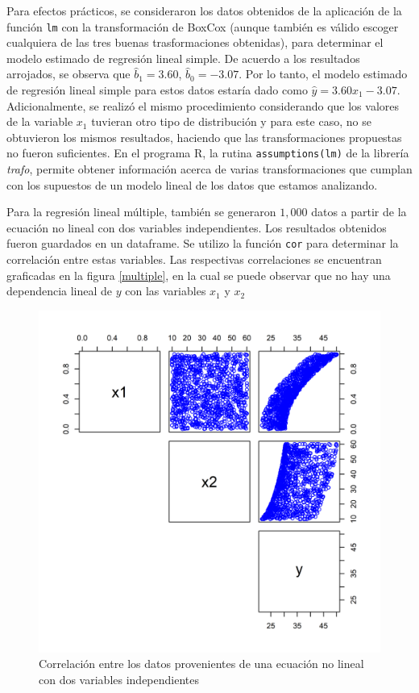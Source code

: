 \documentclass{article}
\begin{document}
Para efectos prácticos, se consideraron los datos obtenidos de la aplicación de la función \texttt{lm} con la transformación de Box\textendash Cox (aunque también es válido escoger cualquiera de las tres buenas trasformaciones obtenidas), para determinar el modelo estimado de regresión lineal simple. De acuerdo a los resultados arrojados, se observa que $\hat{b}_{1} = 3.60$, $\hat{b}_{0} = -3.07$. Por lo tanto, el modelo estimado de regresión lineal simple para estos datos estaría dado como $\hat{y}=3.60x_{1}-3.07$. Adicionalmente, se realizó el mismo procedimiento considerando que los valores de la variable $x_{1}$ tuvieran otro tipo de distribución y para este caso, no se obtuvieron los mismos resultados, haciendo que las transformaciones propuestas no fueron suficientes. En el programa R, la rutina \texttt{assumptions(lm)} de la librería \textit{trafo}, permite obtener información acerca de varias transformaciones que cumplan con los supuestos de un modelo lineal de los datos que estamos analizando.

Para la regresión lineal múltiple, también se generaron $1,000$ datos a partir de la ecuación no lineal con dos variables independientes. Los resultados obtenidos fueron guardados en un dataframe. Se utilizo la función \texttt{cor} para determinar la correlación entre estas variables. Las respectivas correlaciones se encuentran graficadas en la figura \ref{multiple}, en la cual se puede observar que no hay una dependencia lineal de $y$ con las variables $x_{1}$ y $x_{2}$

\begin{figure}[h]
\centering
\includegraphics[scale=0.7]{Figures/multiplenolineal.png}
\caption{Correlación entre los datos provenientes de una ecuación no lineal con dos variables independientes}
\label{ec1}
\end{figure}
\end{document}
